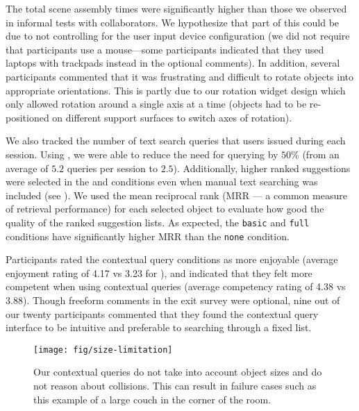 \documentclass{sigchi}
\begin{document}
The total scene assembly times were significantly higher than those we observed in informal tests with collaborators.  We hypothesize that part of this could be due to not controlling for the user input device configuration (we did not require that participants use a mouse---some participants indicated that they used laptops with trackpads instead in the optional comments).  In addition, several participants commented that it was frustrating and difficult to rotate objects into appropriate orientations.  This is partly due to our rotation widget design which only allowed rotation around a single axis at a time (objects had to be re-positioned on different support surfaces to switch axes of rotation).

We also tracked the number of text search queries that users issued during each session.  Using \SceneSuggest, we were able to reduce the need for querying by $50\%$ (from an average of $5.2$ queries per session to $2.5$).  Additionally, higher ranked suggestions were selected in the \basic and \full conditions even when manual text searching was included (see ).  We used the mean reciprocal rank (MRR --- a common measure of retrieval performance) for each selected object to evaluate how good the quality of the ranked suggestion lists.  As expected, the \texttt{basic} and \texttt{full} conditions have significantly higher MRR than the \texttt{none} condition.

Participants rated the contextual query conditions as more enjoyable (average enjoyment rating of 4.17 vs 3.23 for \none), and indicated that they felt more competent when using contextual queries (average competency rating of 4.38 vs 3.88).  Though freeform comments in the exit survey were optional, nine out of our twenty participants commented that they found the contextual query interface to be intuitive and preferable to searching through a fixed list.



\begin{figure}
  \texttt{[image: fig/size-limitation]}
  \caption{Our contextual queries do not take into account object sizes and do not reason about collisions.  This can result in failure cases such as this example of a large couch in the corner of the room.}
  \label{fig:size-limitation}
\end{figure}
\end{document}
